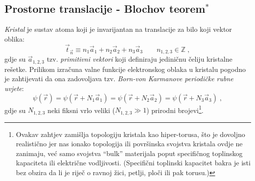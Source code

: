 % 
 
\subsection{Prostorne translacije - Blochov teorem$^*$}

\emph{Kristal} je sustav atoma koji je invarijantan na translacije 
za bilo koji vektor oblika:
\begin{equation}
  \vec{t}_{\vec{n}} \equiv n_1 \vec{a}_1 + n_2 \vec{a}_2 
  + n_3  \vec{a}_3 \qquad n_{1,2,3}\in\mathbb{Z}\;,
\label{tn}
\end{equation}
gdje su $\vec{a}_{1,2,3}$ tzv. \emph{primitivni vektori} koji definiraju
jediničnu čeliju kristalne rešetke. Prilikom izračuna valne funkcije 
elektronskog
oblaka u kristalu pogodno je zahtijevati da ona zadovoljava tzv.
\emph{Born-von Karmanove periodičke rubne uvjete}:
\begin{equation}
 \psi(\vec{r}) = \psi(\vec{r} + N_1 \vec{a}_1)= \psi(\vec{r} + N_2 \vec{a}_2)
= \psi(\vec{r} + N_3 \vec{a}_3) \;,
\end{equation}
gdje su $N_{1,2,3}$ neki fiksni vrlo veliki ($N_{1,2,3}\gg 1$) prirodni 
brojevi\footnote{
Ovakav zahtjev zamišlja topologiju kristala kao hiper-torusa, što je
dovoljno realistično jer nas ionako topologija ili površinska svojstva
kristala ovdje ne zanimaju, već samo svojstva ``bulk'' materijala poput
specifičnog toplinskog kapaciteta ili električne vodljivosti.
(Specifični toplinski kapacitet bakra je isti bez obzira da li je riječ
o ravnoj žici, petlji, ploči ili pak torusu.)}.

